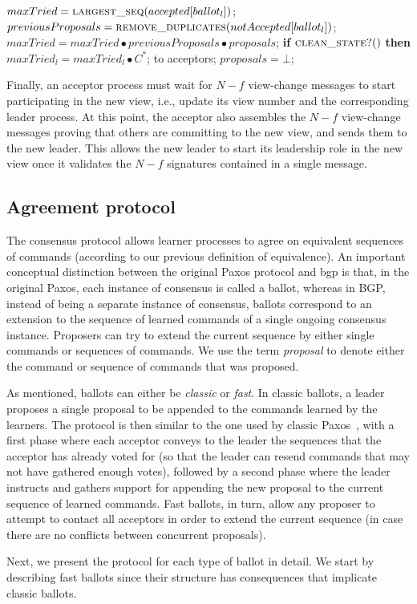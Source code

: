 \begin{algorithm}
\begin{algorithmic}[1]
		\State
		\State $maxTried = \Call{largest\_seq}{accepted[ballot_l]}$;
		\State $previousProposals = \Call{remove\_duplicates}{notAccepted[ballot_l]}$;
		\State $maxTried = maxTried \bullet previousProposals \bullet proposals$;
		\State \textbf{if} $\Call{clean\_state?}{ }$ \textbf{then}
		\State \hspace{\algorithmicindent} $maxTried_l = maxTried_l \bullet C^*$;
		\State {} to acceptors;
		\State $proposals = \bot$;
		\EndFunction
		
	\end{algorithmic}
\end{algorithm}

Finally, an acceptor process must wait for $N-f$ view-change messages to start participating in the new view, i.e., update its view number and the corresponding leader process. At this point, the acceptor also assembles the $N-f$ view-change messages proving that others are committing to the new view, and sends them to the new leader. This allows the new leader to start its leadership role in the new view once it validates the $N-f$ signatures contained in a single message.

\subsection{Agreement protocol} 

The consensus protocol allows learner processes to agree on equivalent sequences of commands (according to our previous definition of equivalence). An important conceptual distinction between the original Paxos protocol and \acrshort{bgp} is that, in the original Paxos, each instance of consensus is called a ballot, whereas in BGP, instead of being a separate instance of consensus, ballots correspond to an extension to the sequence of learned commands of a single ongoing consensus instance. Proposers can try to extend the current sequence by either single commands or sequences of commands. We use the term \textit{proposal} to denote either the command or sequence of commands that was proposed.\par
As mentioned, ballots can either be \textit{classic} or \textit{fast}. In classic ballots, a leader proposes a single proposal to be appended to the commands learned by the learners. The protocol is then similar to the one used by classic Paxos~\cite{Lam98}, with a first phase where each acceptor conveys to the leader the sequences that the acceptor has already voted for (so that the leader can resend commands that may not have gathered enough votes), followed by a second phase where the leader instructs and gathers support for appending the new proposal to the current sequence of learned commands. Fast ballots, in turn, allow any proposer to attempt to contact all acceptors in order to extend the current sequence (in case there are no conflicts between concurrent proposals).\par
Next, we present the protocol for each type of ballot in detail. We start by describing fast ballots since their structure has consequences that implicate classic ballots.

